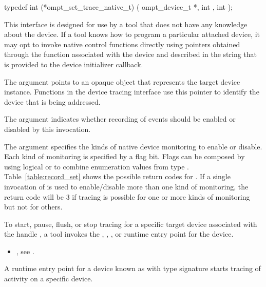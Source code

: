 \format
\begin{ccppspecific}
\begin{omptInquiry}
typedef int (*ompt_set_trace_native_t) (
  ompt_device_t *,
  int ,
  int 
);
\end{omptInquiry}
\end{ccppspecific}

\descr
This interface is designed for use by a tool that does not have any knowledge 
about the device. If a tool knows how to program a particular
attached device, it may opt to invoke native control functions
directly using pointers obtained through the  function
associated with the device and described in the 
string that is provided to the device initializer callback.

\argdesc
The  argument points to an opaque object that represents
the target device instance. Functions in the device tracing interface
use this pointer to identify the device that is being addressed.

The argument  indicates whether recording of events
should be enabled or disabled by this invocation.

The argument  specifies the kinds of native device
monitoring to enable or disable.
Each kind of monitoring is specified by a flag bit.
Flags can be composed by using logical {\ttfamily or}  to combine enumeration
values from type .
Table~\ref{table:record_set} shows the possible return codes for
.  If a single invocation of
 is used to enable/disable more
than one kind of monitoring, the return code will be 3 if tracing
is possible for one or more kinds of monitoring but not for others.

To start, pause, flush, or stop tracing for a specific target device
associated with the handle , a tool invokes the 
, , , or
 runtime entry point for the device.


\crossreferences
\begin{itemize}
\item {},
see .
\end{itemize}

\label{sec:ompt_start_trace_t}

\summary
A runtime entry point for a device known as 
with type signature 
starts tracing of activity on a specific device.

